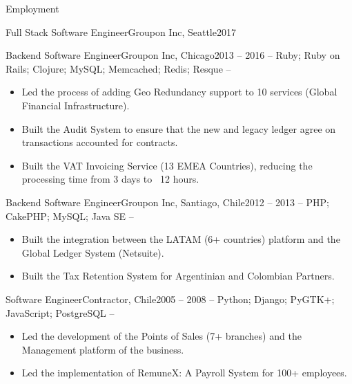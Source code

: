 \documentclass[includefoot]{mcdowellcv}
\begin{document}
\begin{cvsection}{Employment}
\begin{cvsubsection}{Full Stack Software Engineer}{Groupon Inc, Seattle}{2017}
\begin{itemize}
			\end{itemize}
		\end{cvsubsection}
		\begin{cvsubsection}{Backend Software Engineer}{Groupon Inc, Chicago}{2013 -- 2016}
			 -- Ruby; Ruby on Rails; Clojure; MySQL; Memcached; Redis; Resque --
			\begin{itemize}
				\item Led the process of adding Geo Redundancy support to 10 services (Global Financial Infrastructure).
				\item Built the Audit System to ensure that the new and legacy ledger agree on transactions accounted for contracts.
				\item Built the VAT Invoicing Service (13 EMEA Countries), reducing the processing time from 3 days to ~12 hours.
			\end{itemize}
		\end{cvsubsection}
		\begin{cvsubsection}{Backend Software Engineer}{Groupon Inc, Santiago, Chile}{2012 -- 2013}
			 -- PHP; CakePHP; MySQL; Java SE --
			\begin{itemize}
				\item Built the integration between the LATAM (6+ countries) platform and the Global Ledger System (Netsuite).
				\item Built the Tax Retention System for Argentinian and Colombian Partners.
			\end{itemize}
		\end{cvsubsection}		
		\begin{cvsubsection}{Software Engineer}{Contractor, Chile}{2005 -- 2008}
		         -- Python; Django; PyGTK+; JavaScript; PostgreSQL --
			\begin{itemize}
				\item Led the development of the Points of Sales (7+ branches) and the Management platform of the business.
				\item Led the implementation of RemuneX: A Payroll System for 100+ employees.
			\end{itemize}
		\end{cvsubsection}
	\end{cvsection}
	
\end{document}
